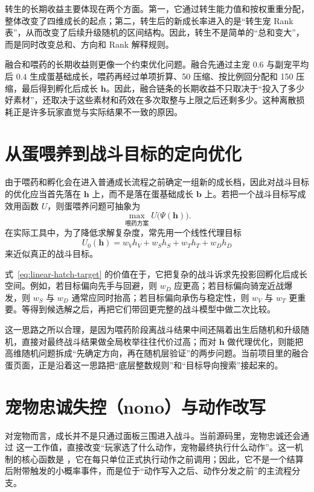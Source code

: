 转生的长期收益主要体现在两个方面。第一，它通过转生能力值和按权重重分配，整体改变了四维成长的起点；第二，转生后的新成长率进入的是“转生宠 Rank 表”，从而改变了后续升级随机的区间结构。因此，转生不是简单的“总和变大”，而是同时改变总和、方向和 Rank 解释规则。

融合和喂药的长期收益则更像一个约束优化问题。融合先通过主宠 $0.6$ 与副宠平均后 $0.4$ 生成蛋基础成长，喂药再经过单项折算、50 压缩、按比例回分配和 150 压缩，最后得到孵化后成长 $\bm{h}$。因此，融合链条的长期收益不只取决于“投入了多少好素材”，还取决于这些素材和药效在多次取整与上限之后还剩多少。这种离散损耗正是许多玩家直觉与实际结果不一致的原因。

\section{从蛋喂养到战斗目标的定向优化}

由于喂药和孵化会在进入普通成长流程之前确定一组新的成长档，因此对战斗目标的优化应当首先落在 $\bm{h}$ 上，而不是落在蛋基础成长 $\bm{b}$ 上。若把一个战斗目标写成效用函数 $U$，则蛋喂养问题可抽象为
\begin{equation}
    \max_{\text{喂药方案}} U\bigl(\Psi(\bm{h})\bigr).
\end{equation}
在实际工具中，为了降低求解复杂度，常先用一个线性代理目标
\begin{equation}
    U_0(\bm{h}) = w_V h_V + w_S h_S + w_T h_T + w_D h_D
    \label{eq:linear-hatch-target}
\end{equation}
来近似真正的战斗目标。

式~\eqref{eq:linear-hatch-target} 的价值在于，它把复杂的战斗诉求先投影回孵化后成长空间。例如，若目标偏向先手与回避，则 $w_D$ 应更高；若目标偏向骑宠近战爆发，则 $w_S$ 与 $w_D$ 通常应同时抬高；若目标偏向承伤与稳定性，则 $w_V$ 与 $w_T$ 更重要。等得到候选解之后，再把它们带回更完整的战斗模型中做二次比较。

这一思路之所以合理，是因为喂药阶段离战斗结果中间还隔着出生后随机和升级随机，直接对最终战斗结果做全局枚举往往代价过高；而对 $\bm{h}$ 做代理优化，则能把高维随机问题拆成“先确定方向，再在随机层验证”的两步问题。当前项目里的融合蛋页面，正是沿着这一思路把“底层整数规则”和“目标导向搜索”接起来的。


\section{宠物忠诚失控（nono）与动作改写}

对宠物而言，成长并不是只通过面板三围进入战斗。当前源码里，宠物忠诚还会通过  这一工作值，直接改变“玩家选了什么动作，宠物最终执行什么动作”。这一机制的核心函数是 ，它在每只单位正式执行动作之前调用；因此，它不是一个结算后附带触发的小概率事件，而是位于“动作写入之后、动作分发之前”的主流程分支。

